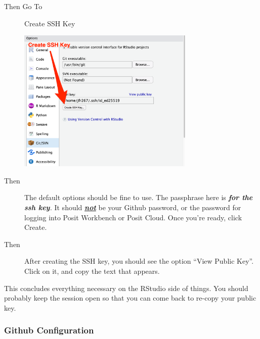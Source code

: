 \documentclass[
  letterpaper,
  DIV=11,
  numbers=noendperiod]{scrartcl}
\begin{document}
\begin{tcolorbox}[enhanced jigsaw, leftrule=.75mm, colback=white, left=2mm, bottomrule=.15mm, rightrule=.15mm, breakable, arc=.35mm, opacityback=0, colframe=quarto-callout-tip-color-frame, toprule=.15mm]
\begin{figure}[H]
{}

\end{figure}

\begin{description}
\item[Then Go To]
Create SSH Key
\end{description}

\begin{figure}[H]

{\centering \includegraphics[width=0.75\textwidth,height=\textheight]{github_onboarding_assets/create_ssh_key.png}

}

\end{figure}

\begin{description}
\item[Then]
The default options should be fine to use. The passphrase here is
\emph{\textbf{for the ssh key}.} It should \uline{\textbf{\emph{not}}}
be your Github password, or the password for logging into Posit
Workbench or Posit Cloud. Once you're ready, click Create.
\item[Then]
After creating the SSH key, you should see the option ``View Public
Key''. Click on it, and copy the text that appears.
\end{description}

\end{tcolorbox}

This concludes everything necessary on the RStudio side of things. You
should probably keep the session open so that you can come back to
re-copy your public key.

\hypertarget{github-configuration}{%
\subsubsection{Github Configuration}\label{github-configuration}}
\end{document}

